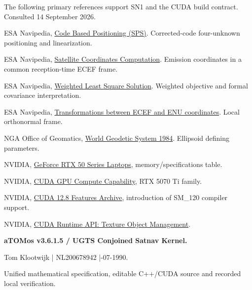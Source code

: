 \documentclass[11pt,a4paper]{article}
\begin{document}
The following primary references support SN1 and the CUDA build contract. Consulted 14 September 2026.
\small
\begin{description}[style=nextline,leftmargin=9mm]
\item[N1] ESA Navipedia, \href{https://gssc.esa.int/navipedia/index.php/Code_Based_Positioning_(SPS)}{Code Based Positioning (SPS)}. Corrected-code four-unknown positioning and linearization.
\item[N2] ESA Navipedia, \href{https://gssc.esa.int/navipedia/index.php/Satellite_Coordinates_Computation}{Satellite Coordinates Computation}. Emission coordinates in a common reception-time ECEF frame.
\item[N3] ESA Navipedia, \href{https://gssc.esa.int/navipedia/index.php/Weighted_Least_Square_Solution_(WLS)}{Weighted Least Square Solution}. Weighted objective and formal covariance interpretation.
\item[N4] ESA Navipedia, \href{https://gssc.esa.int/navipedia/index.php/Transformations_between_ECEF_and_ENU_coordinates}{Transformations between ECEF and ENU coordinates}. Local orthonormal frame.
\item[N5] NGA Office of Geomatics, \href{https://earth-info.nga.mil/index.php?dir=wgs84&action=wgs84}{World Geodetic System 1984}. Ellipsoid defining parameters.
\item[H1] NVIDIA, \href{https://www.nvidia.com/en-us/geforce/laptops/50-series/}{GeForce RTX 50 Series Laptops}, memory/specifications table.
\item[H2] NVIDIA, \href{https://developer.nvidia.com/cuda/gpus}{CUDA GPU Compute Capability}, RTX 5070 Ti family.
\item[H3] NVIDIA, \href{https://docs.nvidia.com/cuda/archive/12.8.0/cuda-features-archive/index.html}{CUDA 12.8 Features Archive}, introduction of SM\_120 compiler support.
\item[H4] NVIDIA, \href{https://docs.nvidia.com/cuda/cuda-runtime-api/group__CUDART__TEXTURE__OBJECT.html}{CUDA Runtime API: Texture Object Management}.
\end{description}
\normalsize
\vfill
{\small\color{muted}\textbf{aTOMos v3.6.1.5 / UGTS Conjoined Satnav Kernel.}\par
Tom Klootwijk \;|\; NL200678942 \;|-07-1990.\par
Unified mathematical specification, editable C++/CUDA source and recorded local verification.}
\end{document}
